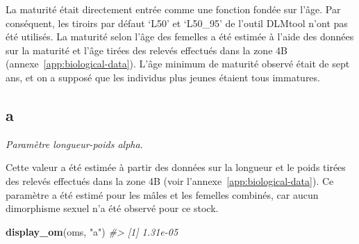 \documentclass[11pt]{book}
\newenvironment{Shaded}{\begin{snugshade}}{\end{snugshade}}
\newcommand{\CommentTok}[1]{\textcolor[rgb]{0.56,0.35,0.01}{\textit{#1}}}
\newcommand{\ControlFlowTok}[1]{\textcolor[rgb]{0.13,0.29,0.53}{\textbf{#1}}}
\newcommand{\DecValTok}[1]{\textcolor[rgb]{0.00,0.00,0.81}{#1}}
\newcommand{\FloatTok}[1]{\textcolor[rgb]{0.00,0.00,0.81}{#1}}
\newcommand{\KeywordTok}[1]{\textcolor[rgb]{0.13,0.29,0.53}{\textbf{#1}}}
\newcommand{\NormalTok}[1]{#1}
\newcommand{\OperatorTok}[1]{\textcolor[rgb]{0.81,0.36,0.00}{\textbf{#1}}}
\newcommand{\StringTok}[1]{\textcolor[rgb]{0.31,0.60,0.02}{#1}}
\begin{document}
La maturité était directement entrée comme une fonction fondée sur l'âge. Par conséquent, les tiroirs par défaut `L50' et `L50\_95' de l'outil DLMtool n'ont pas été utilisés. La maturité selon l'âge des femelles a été estimée à l'aide des données sur la maturité et l'âge tirées des relevés effectués dans la zone 4B (annexe~\ref{app:biological-data}). L'âge minimum de maturité observé était de sept ans, et on a supposé que les individus plus jeunes étaient tous immatures.
\begin{Shaded}
\end{Shaded}
\label{app:desc-stock-a-yelloweye}
\subsection{a}

\emph{Paramètre longueur-poids alpha.}

Cette valeur a été estimée à partir des données sur la longueur et le poids tirées des relevés effectués dans la zone 4B (voir l'annexe~\ref{app:biological-data}). Ce paramètre a été estimé pour les mâles et les femelles combinés, car aucun dimorphisme sexuel n'a été observé pour ce stock.
\begin{Shaded}
\begin{Highlighting}[]
\KeywordTok{display_om}\NormalTok{(oms, }\StringTok{"a"}\NormalTok{)}
\CommentTok{#> [1] 1.31e-05}
\end{Highlighting}
\end{Shaded}
\label{app:desc-stock-b-yelloweye}
\end{document}
